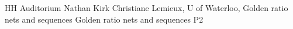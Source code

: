 {HH Auditorium}	%
{Nathan Kirk}		%
{Christiane Lemieux, U of Waterloo, Golden ratio nets and sequences}	%
{Golden ratio nets and sequences}		%
{P2}		%
\\\hline
